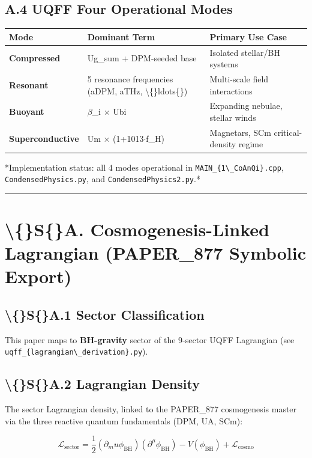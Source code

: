 \documentclass[11pt]{article}
\begin{document}
\subsection*{A.4 UQFF Four Operational Modes}

\begin{center}
\begin{longtable}{lll}
\toprule
Mode & Dominant Term & Primary Use Case \tabularnewline
\midrule
\endhead
\textbf{Compressed} & Ug\_sum + DPM-seeded base & Isolated stellar/BH systems \tabularnewline
\textbf{Resonant} & 5 resonance frequencies (aDPM, aTHz, \textbackslash\{\}ldots\{\}) & Multi-scale field interactions \tabularnewline
\textbf{Buoyant} & $\beta$\_i $\times$ Ubi & Expanding nebulae, stellar winds \tabularnewline
\textbf{Superconductive} & Um $\times$ (1+1013$\cdot$f\_H) & Magnetars, SCm critical-density regime \tabularnewline
\bottomrule
\end{longtable}
\end{center}

*Implementation status: all 4 modes operational in \verb|MAIN_{1\_CoAnQi}.cpp|, \verb|CondensedPhysics.py|, and \verb|CondensedPhysics2.py|.*

\noindent\rule{\textwidth}{0.4pt}

\section*{\textbackslash\{\}S\{\}A. Cosmogenesis-Linked Lagrangian (PAPER\_877 Symbolic Export)}

\subsection*{\textbackslash\{\}S\{\}A.1 Sector Classification}

This paper maps to \textbf{BH-gravity} sector of the 9-sector UQFF Lagrangian (see \verb|uqff_{lagrangian\_derivation}.py|).

\subsection*{\textbackslash\{\}S\{\}A.2 Lagrangian Density}

The sector Lagrangian density, linked to the PAPER\_877 cosmogenesis master via the three reactive quantum fundamentals (DPM, UA, SCm):

$$\mathcal{L}_{\mathrm{sector}} = \frac{1}{2}(\partial_mu \phi_{\mathrm{BH}})(\partial^\mu \phi_{\mathrm{BH}}) - V(\phi_{\mathrm{BH}}) + \mathcal{L}_{\mathrm{cosmo}}$$
\end{document}
